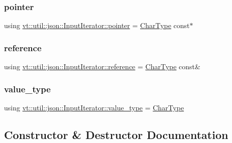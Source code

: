 \subsubsection{\texorpdfstring{pointer}{pointer}}
{\footnotesize\ttfamily using \hyperlink{structvt_1_1util_1_1json_1_1_input_iterator_a508d1d9795a5002f52471321197e4174}{vt\+::util\+::json\+::\+Input\+Iterator\+::pointer} =  \hyperlink{structvt_1_1util_1_1json_1_1_input_iterator_ade8dadafc1ee3baa8ebf11bcfbb1efd4}{Char\+Type} const$\ast$}

\mbox{\label{structvt_1_1util_1_1json_1_1_input_iterator_ac178e9ca2ff42160d54fd0b9080c1d40}} 
\subsubsection{\texorpdfstring{reference}{reference}}
{\footnotesize\ttfamily using \hyperlink{structvt_1_1util_1_1json_1_1_input_iterator_ac178e9ca2ff42160d54fd0b9080c1d40}{vt\+::util\+::json\+::\+Input\+Iterator\+::reference} =  \hyperlink{structvt_1_1util_1_1json_1_1_input_iterator_ade8dadafc1ee3baa8ebf11bcfbb1efd4}{Char\+Type} const\&}

\mbox{\label{structvt_1_1util_1_1json_1_1_input_iterator_a5f85f8a6e8a9aded85bbc4927cdb754e}} 
\subsubsection{\texorpdfstring{value\+\_\+type}{value\_type}}
{\footnotesize\ttfamily using \hyperlink{structvt_1_1util_1_1json_1_1_input_iterator_a5f85f8a6e8a9aded85bbc4927cdb754e}{vt\+::util\+::json\+::\+Input\+Iterator\+::value\+\_\+type} =  \hyperlink{structvt_1_1util_1_1json_1_1_input_iterator_ade8dadafc1ee3baa8ebf11bcfbb1efd4}{Char\+Type}}



\subsection{Constructor \& Destructor Documentation}
\mbox{\label{structvt_1_1util_1_1json_1_1_input_iterator_a62d85ae4d87d2fc677c384fb0debfb2a}} 
